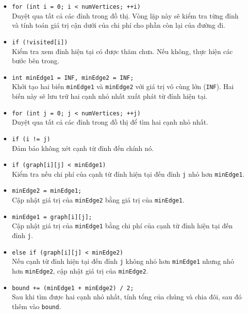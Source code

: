\documentclass[a4paper]{article}
\begin{document}
\begin{itemize}
\begin{itemize}
\begin{itemize}
    \item \texttt{for (int i = 0; i < numVertices; ++i)} \\
    Duyệt qua tất cả các đỉnh trong đồ thị. Vòng lặp này sẽ kiểm tra từng đỉnh và tính toán giá trị cận dưới của chi phí cho phần còn lại của đường đi.

    \item \texttt{if (!visited[i])} \\
    Kiểm tra xem đỉnh hiện tại có được thăm chưa. Nếu không, thực hiện các bước bên trong.

    \item \texttt{int minEdge1 = INF, minEdge2 = INF;} \\
    Khởi tạo hai biến \texttt{minEdge1} và \texttt{minEdge2} với giá trị vô cùng lớn (\texttt{INF}). Hai biến này sẽ lưu trữ hai cạnh nhỏ nhất xuất phát từ đỉnh hiện tại.

    \item \texttt{for (int j = 0; j < numVertices; ++j)} \\
    Duyệt qua tất cả các đỉnh trong đồ thị để tìm hai cạnh nhỏ nhất.

    \item \texttt{if (i != j)} \\
    Đảm bảo không xét cạnh từ đỉnh đến chính nó.

    \item \texttt{if (graph[i][j] < minEdge1)} \\
    Kiểm tra nếu chi phí của cạnh từ đỉnh hiện tại đến đỉnh \texttt{j} nhỏ hơn \texttt{minEdge1}.

    \item \texttt{minEdge2 = minEdge1;} \\
    Cập nhật giá trị của \texttt{minEdge2} bằng giá trị của \texttt{minEdge1}.

    \item \texttt{minEdge1 = graph[i][j];} \\
    Cập nhật giá trị của \texttt{minEdge1} bằng chi phí của cạnh từ đỉnh hiện tại đến đỉnh \texttt{j}.

    \item \texttt{else if (graph[i][j] < minEdge2)} \\
    Nếu cạnh từ đỉnh hiện tại đến đỉnh \texttt{j} không nhỏ hơn \texttt{minEdge1} nhưng nhỏ hơn \texttt{minEdge2}, cập nhật giá trị của \texttt{minEdge2}.

    \item \texttt{bound += (minEdge1 + minEdge2) / 2;} \\
    Sau khi tìm được hai cạnh nhỏ nhất, tính tổng của chúng và chia đôi, sau đó thêm vào \texttt{bound}.


\end{itemize}
\end{itemize}
\end{itemize}
\end{document}
